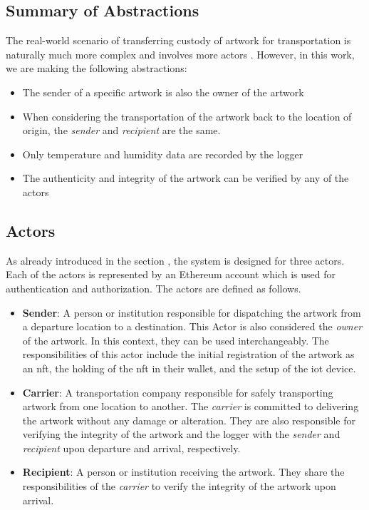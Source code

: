 \subsection*{Summary of Abstractions}
The real-world scenario of transferring custody of artwork for transportation is naturally much more complex and involves more actors \cite{artintransit}. However, in this work, we are making the following abstractions:
\begin{itemize}
    \item The sender of a specific artwork is also the owner of the artwork
    \item When considering the transportation of the artwork back to the location of origin, the \textit{sender} and \textit{recipient} are the same.
    \item Only temperature and humidity data are recorded by the logger
    \item The authenticity and integrity of the artwork can be verified by any of the actors
\end{itemize}

\subsection{Actors}
As already introduced in the section , the system is designed for three actors. Each of the actors is represented by an Ethereum account which is used for authentication and authorization. The actors are defined as follows.

\begin{itemize}[align=left, font=\itshape]
    \item \textbf{Sender}: A person or institution responsible for dispatching the artwork from a departure location to a destination. This Actor is also considered the \textit{owner} of the artwork. In this context, they can be used interchangeably. The responsibilities of this actor include the initial registration of the artwork as an \gls{nft}, the holding of the \gls{nft} in their \gls{wallet}, and the setup of the \gls{iot} device.

    \item \textbf{Carrier}: A transportation company responsible for safely transporting artwork from one location to another. The \textit{carrier} is committed to delivering the artwork without any damage or alteration. They are also responsible for verifying the integrity of the artwork and the logger with the \textit{sender} and \textit{recipient} upon departure and arrival, respectively.

    \item \textbf{Recipient}: A person or institution receiving the artwork. They share the responsibilities of the \textit{carrier} to verify the integrity of the artwork upon arrival. 
\end{itemize}

